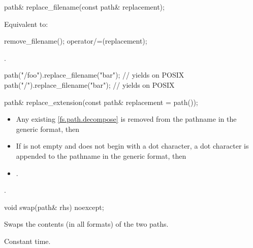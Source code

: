 %
\begin{itemdecl}
path& replace_filename(const path& replacement);
\end{itemdecl}

\begin{itemdescr}
\pnum
\effects
Equivalent to:
\begin{codeblock}
remove_filename();
operator/=(replacement);
\end{codeblock}

\pnum
\returns {}.

\pnum
\begin{example}
\begin{codeblock}
path("/foo").replace_filename("bar");  // yields  on POSIX
path("/").replace_filename("bar");     // yields  on POSIX
\end{codeblock}
\end{example}
\end{itemdescr}

%
\begin{itemdecl}
path& replace_extension(const path& replacement = path());
\end{itemdecl}

\begin{itemdescr}
\pnum
\effects
  \begin{itemize}
\item Any existing \ref{fs.path.decompose}\tcode{)} is removed from the
    pathname in the generic format,
    then
\item If  is not empty and does not begin with a dot
    character, a dot character is appended to the pathname in the generic format, then
\item
  .
  \end{itemize}

\pnum
\returns {}.
\end{itemdescr}

%
\begin{itemdecl}
void swap(path& rhs) noexcept;
\end{itemdecl}

\begin{itemdescr}
\pnum
\effects Swaps the contents (in all formats) of the two paths.

\pnum
\complexity Constant time.
\end{itemdescr}

